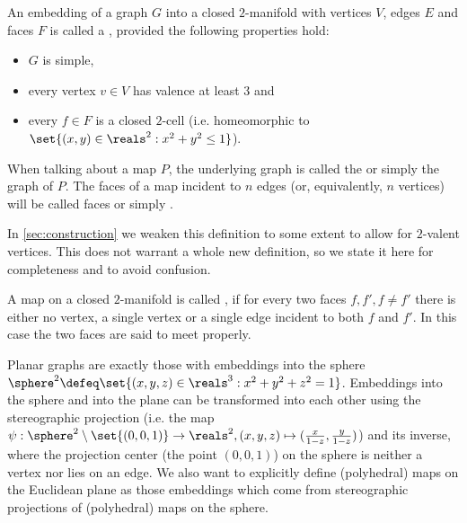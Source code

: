 \begin{definition} \label{def:map} An embedding of a graph $G$ into a closed $2$-manifold with vertices $V$, edges $E$ and faces $F$ is called a , provided the following properties hold:
  \begin{itemize}
  \item $G$ is simple,
  \item every vertex $v \in V$ has valence at least $3$ and
  \item every $f \in F$ is a closed $2$-cell (i.e. homeomorphic to $\set{(x, y) \in \reals^2 : x^2 + y^2 \leq 1}$).
  \end{itemize}
  When talking about a map $P$, the underlying graph is called the  or simply the graph of $P$. The faces of a map incident to $n$ edges (or, equivalently, $n$ vertices) will be called  faces or simply .
\end{definition}

\begin{remark}
  In \autoref{sec:construction} we weaken this definition to some extent to allow for $2$-valent vertices. This does not warrant a whole new definition, so we state it here for completeness and to avoid confusion.
\end{remark}

\begin{definition} \label{def:polymap} A map on a closed $2$-manifold is called , if for every two faces $f, f', f \neq f'$ there is either no vertex, a single vertex or a single edge incident to both $f$ and $f'$. In this case the two faces are said to meet properly. 
\end{definition}

\begin{remark} Planar graphs are exactly those with embeddings into the sphere $\sphere^2 \defeq \set{(x, y, z) \in \reals^3 : x^2 + y^2 + z^2 = 1}$. Embeddings into the sphere and into the plane can be transformed into each other using the stereographic projection (i.e. the map $\psi: \sphere^2 \setminus \set{(0, 0, 1)} \to \reals^2, (x, y, z) \mapsto (\frac{x}{1-z}, \frac{y}{1-z})$) and its inverse, where the projection center (the point $(0, 0, 1)$) on the sphere is neither a vertex nor lies on an edge. We also want to explicitly define (polyhedral) maps on the Euclidean plane as those embeddings which come from stereographic projections of (polyhedral) maps on the sphere.
\end{remark}

